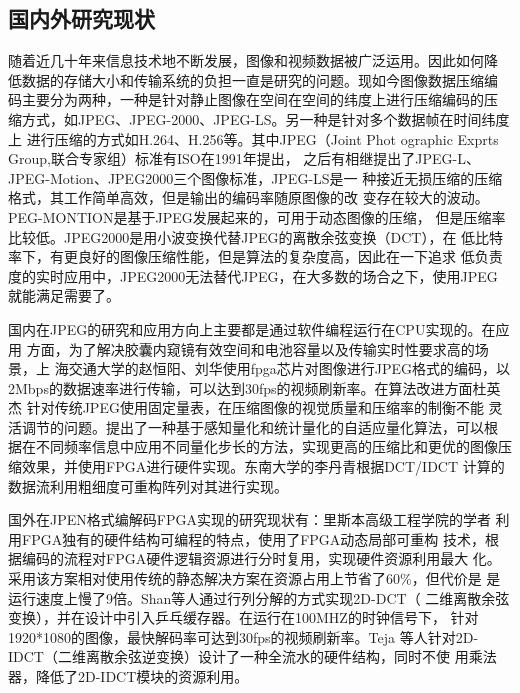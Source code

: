 \documentclass{article}
\numberwithin {equation}{section}
\begin{document}
\begin{spacing}{1.25}
  \subsection{国内外研究现状}
    \vspace{1em}
    随着近几十年来信息技术地不断发展，图像和视频数据被广泛运用。因此如何降
    低数据的存储大小和传输系统的负担一直是研究的问题。现如今图像数据压缩编
    码主要分为两种，一种是针对静止图像在空间在空间的纬度上进行压缩编码的压
    缩方式，如JPEG、JPEG-2000、JPEG-LS。另一种是针对多个数据帧在时间纬度上
    进行压缩的方式如H.264、H.256\cite{sze2014high}等。其中JPEG（Joint Phot
    ographic Exprts Group,联合专家组）标准有ISO在1991年提出\cite{pennebaker1992jpeg}，
    之后有相继提出了JPEG-L、JPEG-Motion、JPEG2000三个图像标准，JPEG-LS是一
    种接近无损压缩的压缩格式，其工作简单高效，但是输出的编码率随原图像的改
    变存在较大的波动。PEG-MONTION是基于JPEG发展起来的，可用于动态图像的压缩，
    但是压缩率比较低。JPEG2000是用小波变换代替JPEG的离散余弦变换（DCT），在
    低比特率下，有更良好的图像压缩性能，但是算法的复杂度高，因此在一下追求
    低负责度的实时应用中，JPEG2000无法替代JPEG，在大多数的场合之下，使用JPEG
    就能满足需要了。

    国内在JPEG的研究和应用方向上主要都是通过软件编程运行在CPU实现的。在应用
    方面，为了解决胶囊内窥镜有效空间和电池容量以及传输实时性要求高的场景，上
    海交通大学的赵恒阳、刘华\cite{ref1}使用fpga芯片对图像进行JPEG格式的编码，以
    2Mbps的数据速率进行传输，可以达到30fps的视频刷新率。在算法改进方面杜英杰
    \cite{ref2}针对传统JPEG使用固定量表，在压缩图像的视觉质量和压缩率的制衡不能
    灵活调节的问题。提出了一种基于感知量化和统计量化的自适应量化算法，可以根
    据在不同频率信息中应用不同量化步长的方法，实现更高的压缩比和更优的图像压
    缩效果，并使用FPGA进行硬件实现。东南大学的李丹青\cite{可重构}根据DCT/IDCT
    计算的数据流利用粗细度可重构阵列对其进行实现。

    国外在JPEN格式编解码FPGA实现的研究现状有：里斯本高级工程学院的学者
    \cite{ref10}利用FPGA独有的硬件结构可编程的特点，使用了FPGA动态局部可重构
    技术，根据编码的流程对FPGA硬件逻辑资源进行分时复用，实现硬件资源利用最大
    化。采用该方案相对使用传统的静态解决方案在资源占用上节省了60\%，但代价是
    是运行速度上慢了9倍。Shan等人\cite{ref11}通过行列分解的方式实现2D-DCT（
    二维离散余弦变换），并在设计中引入乒乓缓存器。在运行在100MHZ的时钟信号下，
    针对1920*1080的图像，最快解码率可达到30fps的视频刷新率。Teja\cite{teja2015verilog}
    等人针对2D-IDCT（二维离散余弦逆变换）设计了一种全流水的硬件结构，同时不使
    用乘法器，降低了2D-IDCT模块的资源利用。

\end{spacing}
\end{document}
